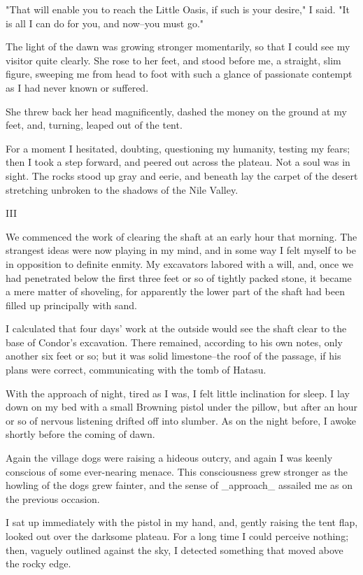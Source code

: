 "That will enable you to reach the Little Oasis, if such is your
desire," I said. "It is all I can do for you, and now--you must go."

The light of the dawn was growing stronger momentarily, so that I
could see my visitor quite clearly. She rose to her feet, and stood
before me, a straight, slim figure, sweeping me from head to foot with
such a glance of passionate contempt as I had never known or suffered.

She threw back her head magnificently, dashed the money on the ground
at my feet, and, turning, leaped out of the tent.

For a moment I hesitated, doubting, questioning my humanity, testing
my fears; then I took a step forward, and peered out across the
plateau. Not a soul was in sight. The rocks stood up gray and eerie,
and beneath lay the carpet of the desert stretching unbroken to the
shadows of the Nile Valley.


III

We commenced the work of clearing the shaft at an early hour that
morning. The strangest ideas were now playing in my mind, and in some
way I felt myself to be in opposition to definite enmity. My
excavators labored with a will, and, once we had penetrated below the
first three feet or so of tightly packed stone, it became a mere
matter of shoveling, for apparently the lower part of the shaft had
been filled up principally with sand.

I calculated that four days' work at the outside would see the shaft
clear to the base of Condor's excavation. There remained, according
to his own notes, only another six feet or so; but it was solid
limestone--the roof of the passage, if his plans were correct,
communicating with the tomb of Hatasu.

With the approach of night, tired as I was, I felt little inclination
for sleep. I lay down on my bed with a small Browning pistol under the
pillow, but after an hour or so of nervous listening drifted off into
slumber. As on the night before, I awoke shortly before the coming of
dawn.

Again the village dogs were raising a hideous outcry, and again I was
keenly conscious of some ever-nearing menace. This consciousness grew
stronger as the howling of the dogs grew fainter, and the sense of
_approach_ assailed me as on the previous occasion.

I sat up immediately with the pistol in my hand, and, gently raising
the tent flap, looked out over the darksome plateau. For a long time
I could perceive nothing; then, vaguely outlined against the sky, I
detected something that moved above the rocky edge.

